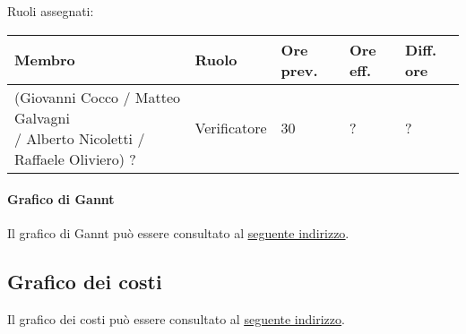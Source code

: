 \documentclass[a4paper, 12pt]{article}
\begin{document}
Ruoli assegnati:\\[0.5em]
\begin{tabular}{|l|l|l|l|l|}\hline
Membro & Ruolo & Ore prev. & Ore eff. & Diff. ore \\\hline
\pbox{20cm}{(Giovanni Cocco / Matteo Galvagni \\/ Alberto Nicoletti / Raffaele Oliviero) ?} & Verificatore & 30 & ? & ? \\\hline
\end{tabular}

\paragraph{Grafico di Gannt}
Il grafico di Gannt può essere consultato al \underline{\href{https://docs.google.com/spreadsheets/d/e/2PACX-1vRd4970Fob6KlNwY1iV6bnHZXNl41F74utFkkc9ykuT1NUEGLnFcCd4rOHbXjW99ichDnkV3cEGCmWi/pubhtml?gid=1972921762}{seguente indirizzo}}.


\subsection{Grafico dei costi}
Il grafico dei costi può essere consultato al \underline{\href{https://docs.google.com/spreadsheets/d/e/2PACX-1vRd4970Fob6KlNwY1iV6bnHZXNl41F74utFkkc9ykuT1NUEGLnFcCd4rOHbXjW99ichDnkV3cEGCmWi/pubhtml?gid=263680959}{seguente indirizzo}}.
\end{document}
